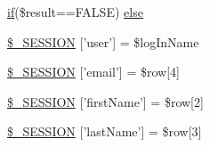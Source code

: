 \begin{DoxyCompactItemize}
\hyperlink{_m_c_maccount_settings_8php_a648419c218c2f0aeb239028519ab83d8}{if}(\$result==F\-A\-L\-S\-E) \hyperlink{_m_c_mlogin_validator_8php_acd73321adf3d3d588369f5341463f6d3}{else}
\item 
\hyperlink{_m_c_mlogin_validator_8php_ad8419ca4a1822c7709da25d22be71556}{\$\-\_\-\-S\-E\-S\-S\-I\-O\-N} \mbox{[}'user'\mbox{]} = \$log\-In\-Name
\item 
\hyperlink{_m_c_mlogin_validator_8php_ac14cd5920e81ae9195ee7dedc259298e}{\$\-\_\-\-S\-E\-S\-S\-I\-O\-N} \mbox{[}'email'\mbox{]} = \$row\mbox{[}4\mbox{]}
\item 
\hyperlink{_m_c_mlogin_validator_8php_aaf39d42d9138df306afd18be93739985}{\$\-\_\-\-S\-E\-S\-S\-I\-O\-N} \mbox{[}'first\-Name'\mbox{]} = \$row\mbox{[}2\mbox{]}
\item 
\hyperlink{_m_c_mlogin_validator_8php_a961298e85809ffdb09f5465640708434}{\$\-\_\-\-S\-E\-S\-S\-I\-O\-N} \mbox{[}'last\-Name'\mbox{]} = \$row\mbox{[}3\mbox{]}
\end{DoxyCompactItemize}


